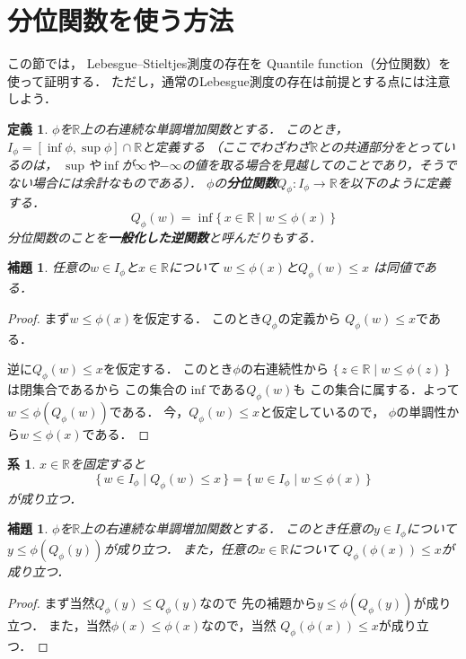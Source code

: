 \documentclass[leqno, a4paper, 12pt]{jsarticle}
\newtheorem{cor}[thm]{系}
\newtheorem{lem}[thm]{補題}
\newtheorem{df}[thm]{定義}
\newcommand{\rr}{\mathbb{R}}
\begin{document}
\section{分位関数を使う方法}
この節では，
Lebesgue--Stieltjes測度の存在を
Quantile function（分位関数）を使って証明する．
ただし，通常のLebesgue測度の存在は前提とする点には注意しよう．

\begin{df}
$\phi$を$\rr$上の右連続な単調増加関数とする．
このとき，
$I_{\phi}=[\inf\phi, \sup\phi]\cap \rr$と定義する
（ここでわざわざ$\rr$との共通部分をとっているのは，
$\sup$や$\inf$が$\infty$や$-\infty$の値を取る場合を見越してのことであり，そうでない場合には余計なものである）．
$\phi$の\textbf{分位関数}$Q_{\phi}: I_{\phi}\to \rr$を以下のように定義する．
\[
Q_{\phi}(w)=\inf\{\, x\in \rr\mid w\le \phi(x)\, \}
\]
分位関数のことを\textbf{一般化した逆関数}と呼んだりもする．
\end{df}



\begin{lem}
任意の$w\in I_{\phi}$と$x\in \rr$について
$w\le \phi(x)$と$Q_{\phi}(w)\le x$
は同値である．
\end{lem}
\begin{proof}
まず$w\le \phi(x)$を仮定する．
このとき$Q_{\phi}$の定義から
$Q_{\phi}(w)\le x$である．

逆に$Q_{\phi}(w)\le x$を仮定する．
このとき$\phi$の右連続性から
$\{\, z\in \rr\mid w\le \phi(z)\, \}$
は閉集合であるから
この集合の$\inf$である$Q_{\phi}(w)$も
この集合に属する．よって
$w\le \phi(Q_{\phi}(w))$である．
今，$Q_{\phi}(w)\le x$と仮定しているので，
$\phi$の単調性から$w\le \phi(x)$である．
\end{proof}

\begin{cor}
$x\in \rr$を固定すると
\[
\{\, w\in I_{\phi}\mid Q_{\phi}(w)\le x\, \}
=\{\, w\in I_{\phi}\mid w\le \phi(x)\, \}
\]
が成り立つ．
\end{cor}



\begin{lem}
$\phi$を$\rr$上の右連続な単調増加関数とする．
このとき任意の$y\in I_{\phi}$について
$y\le \phi(Q_{\phi}(y))$が成り立つ．
また，任意の$x\in \rr$について
$Q_{\phi}(\phi(x))\le x$が成り立つ．
\end{lem}
\begin{proof}
まず当然$Q_{\phi}(y)\le Q_{\phi}(y)$なので
先の補題から$y\le \phi(Q_{\phi}(y))$が成り立つ．
また，当然$\phi(x)\le \phi(x)$なので，当然
$Q_{\phi}(\phi(x))\le x$が成り立つ．
\end{proof}
\end{document}
